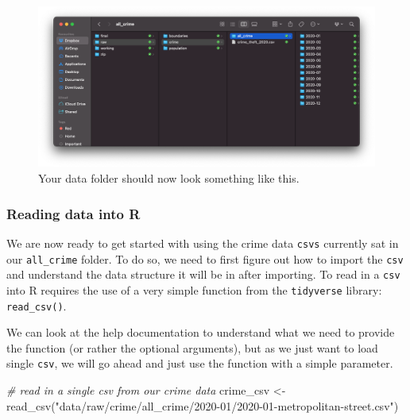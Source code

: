 \documentclass[
]{book}
\newenvironment{Shaded}{\begin{snugshade}}{\end{snugshade}}
\newcommand{\CommentTok}[1]{\textcolor[rgb]{0.56,0.35,0.01}{\textit{#1}}}
\newcommand{\FunctionTok}[1]{\textcolor[rgb]{0.00,0.00,0.00}{#1}}
\newcommand{\NormalTok}[1]{#1}
\newcommand{\OtherTok}[1]{\textcolor[rgb]{0.56,0.35,0.01}{#1}}
\newcommand{\StringTok}[1]{\textcolor[rgb]{0.31,0.60,0.02}{#1}}
\begin{document}
\begin{figure}

{\centering \includegraphics[width=16.76in]{images/w04/organised-crime} 

}

\caption{Your data folder should now look something like this.}\label{fig:04-organised-crime}
\end{figure}

\hypertarget{reading-data-into-r}{%
\subsubsection{Reading data into R}\label{reading-data-into-r}}

We are now ready to get started with using the crime data \texttt{csv\textquotesingle{}s} currently sat in our \texttt{all\_crime} folder. To do so, we need to first figure out how to import the \texttt{csv} and understand the data structure it will be in after importing. To read in a \texttt{csv} into R requires the use of a very simple function from the \texttt{tidyverse} library: \texttt{read\_csv()}.

We can look at the help documentation to understand what we need to provide the function (or rather the optional arguments), but as we just want to load single \texttt{csv}, we will go ahead and just use the function with a simple parameter.

\begin{Shaded}
\begin{Highlighting}[]
\CommentTok{\# read in a single csv from our crime data}
\NormalTok{crime\_csv }\OtherTok{\textless{}{-}} \FunctionTok{read\_csv}\NormalTok{(}\StringTok{"data/raw/crime/all\_crime/2020{-}01/2020{-}01{-}metropolitan{-}street.csv"}\NormalTok{)}
\end{Highlighting}
\end{Shaded}
\end{document}

